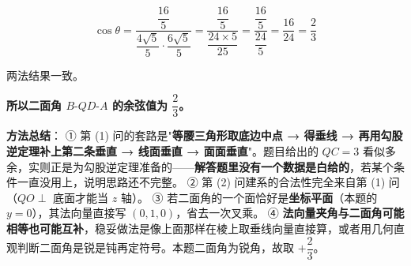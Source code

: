 \begin{answer}
\nopagebreak[4]
\[\cos\theta=\frac{\dfrac{16}5}{\dfrac{4\sqrt5}5\cdot\dfrac{6\sqrt5}5}=\frac{\dfrac{16}5}{\dfrac{24\times5}{25}}=\frac{\dfrac{16}5}{\dfrac{24}5}=\frac{16}{24}=\frac23\]

两法结果一致。

\textbf{所以二面角 $B\text{-}QD\text{-}A$ 的余弦值为 $\dfrac23$。}

\begin{gktip}
\textbf{方法总结}：
① 第 (1) 问的套路是"\textbf{等腰三角形取底边中点 → 得垂线 → 再用勾股逆定理补上第二条垂直 → 线面垂直 → 面面垂直}"。题目给出的 $QC=3$ 看似多余，实则正是为勾股逆定理准备的——\textbf{解答题里没有一个数据是白给的}，若某个条件一直没用上，说明思路还不完整。
② 第 (2) 问建系的合法性完全来自第 (1) 问（$QO\perp$ 底面才能当 $z$ 轴）。
③ 若二面角的一个面恰好是\textbf{坐标平面}（本题的 $y=0$），其法向量直接写 $(0,1,0)$，省去一次叉乘。
④ \textbf{法向量夹角与二面角可能相等也可能互补}，稳妥做法是像上面那样在棱上取垂线向量直接算，或者用几何直观判断二面角是锐是钝再定符号。本题二面角为锐角，故取 $+\dfrac23$。
\end{gktip}



\par\medskip

\end{answer}
